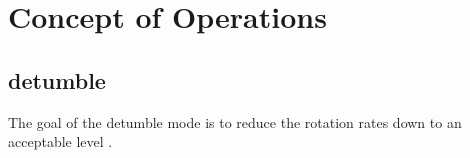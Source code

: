 \section{Concept of Operations}





\subsection{detumble}

The goal of the detumble mode is to reduce the rotation rates down to an acceptable level .




